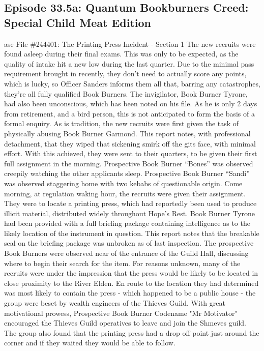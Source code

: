\subsection{Episode 33.5a: Quantum Bookburners Creed: Special Child Meat Edition}
ase File \#244401: The Printing Press Incident - Section 1\medskip
The new recruits were found asleep during their final exams. This was only to be expected, as the quality of intake hit a new low during the last quarter.\medskip
Due to the minimal pass requirement brought in recently, they don’t need to actually score any points, which is lucky, so Officer Sanders informs them all that, barring any catastrophes, they’re all fully qualified Book Burners. The invigilator, Book Burner Tyrone, had also been unconscious, which has been noted on his file. As he is only 2 days from retirement, and a bird person, this is not anticipated to form the basis of a formal enquiry.\medskip
As is tradition, the new recruits were first given the task of physically abusing Book Burner Garmond. This report notes, with professional detachment, that they wiped that sickening smirk off the gits face, with minimal effort.\medskip
With this achieved, they were sent to their quarters, to be given their first full assignment in the morning. Prospective Book Burner “Bones” was observed creepily watching the other applicants sleep. Prospective Book Burner “Sandi” was observed staggering home with two kebabs of questionable origin.\medskip
Come morning, at regulation waking hour, the recruits were given their assignment. They were to locate a printing press, which had reportedly been used to produce illicit material, distributed widely throughout Hope's Rest.\medskip
Book Burner Tyrone had been provided with a full briefing package containing intelligence as to the likely location of the instrument in question. This report notes that the breakable seal on the briefing package was unbroken as of last inspection.\medskip
The prospective Book Burners were observed near of the entrance of the Guild Hall, discussing where to begin their search for the item. For reasons unknown, many of the recruits were under the impression that the press would be likely to be located in close proximity to the River Elden.\medskip
En route to the location they had determined was most likely to contain the press - which happened to be a public house - the group were beset by wealth engineers of the Thieves Guild.\medskip
With great motivational prowess, Prospective Book Burner Codename "Mr Motivator" encouraged the Thieves Guild operatives to leave and join the Shmeves guild. The group also found that the printing press had a drop off point just around the corner and if they waited they would be able to follow.\medskip
